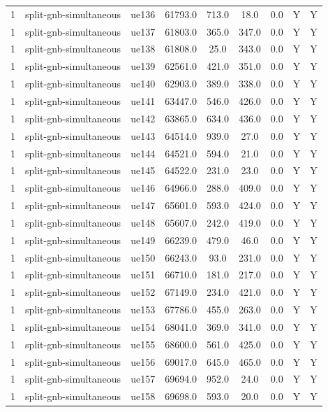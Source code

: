 \begin{table}[ht]
\begin{tabular}{|c|c|c|c|c|c|c|c|c|}
1 & split-gnb-simultaneous & ue136 & 61793.0 & 713.0 & 18.0 & 0.0 & Y & Y \\
1 & split-gnb-simultaneous & ue137 & 61803.0 & 365.0 & 347.0 & 0.0 & Y & Y \\
1 & split-gnb-simultaneous & ue138 & 61808.0 & 25.0 & 343.0 & 0.0 & Y & Y \\
1 & split-gnb-simultaneous & ue139 & 62561.0 & 421.0 & 351.0 & 0.0 & Y & Y \\
1 & split-gnb-simultaneous & ue140 & 62903.0 & 389.0 & 338.0 & 0.0 & Y & Y \\
1 & split-gnb-simultaneous & ue141 & 63447.0 & 546.0 & 426.0 & 0.0 & Y & Y \\
1 & split-gnb-simultaneous & ue142 & 63865.0 & 634.0 & 436.0 & 0.0 & Y & Y \\
1 & split-gnb-simultaneous & ue143 & 64514.0 & 939.0 & 27.0 & 0.0 & Y & Y \\
1 & split-gnb-simultaneous & ue144 & 64521.0 & 594.0 & 21.0 & 0.0 & Y & Y \\
1 & split-gnb-simultaneous & ue145 & 64522.0 & 231.0 & 23.0 & 0.0 & Y & Y \\
1 & split-gnb-simultaneous & ue146 & 64966.0 & 288.0 & 409.0 & 0.0 & Y & Y \\
1 & split-gnb-simultaneous & ue147 & 65601.0 & 593.0 & 424.0 & 0.0 & Y & Y \\
1 & split-gnb-simultaneous & ue148 & 65607.0 & 242.0 & 419.0 & 0.0 & Y & Y \\
1 & split-gnb-simultaneous & ue149 & 66239.0 & 479.0 & 46.0 & 0.0 & Y & Y \\
1 & split-gnb-simultaneous & ue150 & 66243.0 & 93.0 & 231.0 & 0.0 & Y & Y \\
1 & split-gnb-simultaneous & ue151 & 66710.0 & 181.0 & 217.0 & 0.0 & Y & Y \\
1 & split-gnb-simultaneous & ue152 & 67149.0 & 234.0 & 421.0 & 0.0 & Y & Y \\
1 & split-gnb-simultaneous & ue153 & 67786.0 & 455.0 & 263.0 & 0.0 & Y & Y \\
1 & split-gnb-simultaneous & ue154 & 68041.0 & 369.0 & 341.0 & 0.0 & Y & Y \\
1 & split-gnb-simultaneous & ue155 & 68600.0 & 561.0 & 425.0 & 0.0 & Y & Y \\
1 & split-gnb-simultaneous & ue156 & 69017.0 & 645.0 & 465.0 & 0.0 & Y & Y \\
1 & split-gnb-simultaneous & ue157 & 69694.0 & 952.0 & 24.0 & 0.0 & Y & Y \\
1 & split-gnb-simultaneous & ue158 & 69698.0 & 593.0 & 20.0 & 0.0 & Y & Y \\

\end{tabular}
\end{table}
